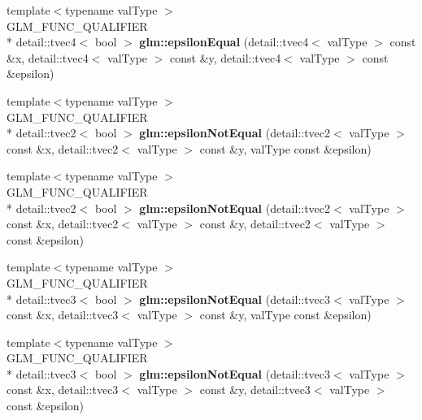 \begin{DoxyCompactItemize}
\item 
\hypertarget{namespaceglm_ab9242e7cebbfedd683fc1dc9ac9195ee}{{\footnotesize template$<$typename val\-Type $>$ }\\G\-L\-M\-\_\-\-F\-U\-N\-C\-\_\-\-Q\-U\-A\-L\-I\-F\-I\-E\-R \\*
detail\-::tvec4$<$ bool $>$ {\bfseries glm\-::epsilon\-Equal} (detail\-::tvec4$<$ val\-Type $>$ const \&x, detail\-::tvec4$<$ val\-Type $>$ const \&y, detail\-::tvec4$<$ val\-Type $>$ const \&epsilon)}\label{namespaceglm_ab9242e7cebbfedd683fc1dc9ac9195ee}

\item 
\hypertarget{namespaceglm_a6a33cb9002c3189710482071fd0f4a4d}{{\footnotesize template$<$typename val\-Type $>$ }\\G\-L\-M\-\_\-\-F\-U\-N\-C\-\_\-\-Q\-U\-A\-L\-I\-F\-I\-E\-R \\*
detail\-::tvec2$<$ bool $>$ {\bfseries glm\-::epsilon\-Not\-Equal} (detail\-::tvec2$<$ val\-Type $>$ const \&x, detail\-::tvec2$<$ val\-Type $>$ const \&y, val\-Type const \&epsilon)}\label{namespaceglm_a6a33cb9002c3189710482071fd0f4a4d}

\item 
\hypertarget{namespaceglm_a12da3487c04448e21ce83c45e78fcc96}{{\footnotesize template$<$typename val\-Type $>$ }\\G\-L\-M\-\_\-\-F\-U\-N\-C\-\_\-\-Q\-U\-A\-L\-I\-F\-I\-E\-R \\*
detail\-::tvec2$<$ bool $>$ {\bfseries glm\-::epsilon\-Not\-Equal} (detail\-::tvec2$<$ val\-Type $>$ const \&x, detail\-::tvec2$<$ val\-Type $>$ const \&y, detail\-::tvec2$<$ val\-Type $>$ const \&epsilon)}\label{namespaceglm_a12da3487c04448e21ce83c45e78fcc96}

\item 
\hypertarget{namespaceglm_a466bb0e71cb9bde8a20c842e48b19338}{{\footnotesize template$<$typename val\-Type $>$ }\\G\-L\-M\-\_\-\-F\-U\-N\-C\-\_\-\-Q\-U\-A\-L\-I\-F\-I\-E\-R \\*
detail\-::tvec3$<$ bool $>$ {\bfseries glm\-::epsilon\-Not\-Equal} (detail\-::tvec3$<$ val\-Type $>$ const \&x, detail\-::tvec3$<$ val\-Type $>$ const \&y, val\-Type const \&epsilon)}\label{namespaceglm_a466bb0e71cb9bde8a20c842e48b19338}

\item 
\hypertarget{namespaceglm_aba2b7a190fc728c40e354ba5d0635f84}{{\footnotesize template$<$typename val\-Type $>$ }\\G\-L\-M\-\_\-\-F\-U\-N\-C\-\_\-\-Q\-U\-A\-L\-I\-F\-I\-E\-R \\*
detail\-::tvec3$<$ bool $>$ {\bfseries glm\-::epsilon\-Not\-Equal} (detail\-::tvec3$<$ val\-Type $>$ const \&x, detail\-::tvec3$<$ val\-Type $>$ const \&y, detail\-::tvec3$<$ val\-Type $>$ const \&epsilon)}\label{namespaceglm_aba2b7a190fc728c40e354ba5d0635f84}


\end{DoxyCompactItemize}
